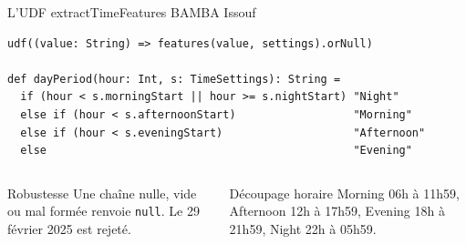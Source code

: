 \documentclass[aspectratio=169,11pt]{beamer}
\newcommand{\legende}[1]{{\color{gris}\footnotesize #1}}
\begin{document}
\begin{frame}[fragile]{L'UDF extractTimeFeatures}
  \legende{BAMBA Issouf}

  \vspace{2mm}
\begin{lstlisting}
udf((value: String) => features(value, settings).orNull)

def dayPeriod(hour: Int, s: TimeSettings): String =
  if (hour < s.morningStart || hour >= s.nightStart) "Night"
  else if (hour < s.afternoonStart)                  "Morning"
  else if (hour < s.eveningStart)                    "Afternoon"
  else                                               "Evening"
\end{lstlisting}

  \vspace{3mm}
  \begin{columns}[t,onlytextwidth]
      \begin{block}{Robustesse}
        \footnotesize Une chaîne nulle, vide ou mal formée renvoie \texttt{null}.
        Le 29 février 2025 est rejeté.
      \end{block}
      \begin{block}{Découpage horaire}
        \footnotesize Morning 06h à 11h59, Afternoon 12h à 17h59, Evening 18h à
        21h59, Night 22h à 05h59.
      \end{block}
  \end{columns}

\end{frame}
\end{document}
